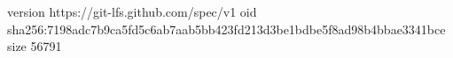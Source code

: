 version https://git-lfs.github.com/spec/v1
oid sha256:7198adc7b9ca5fd5c6ab7aab5bb423fd213d3be1bdbe5f8ad98b4bbae3341bce
size 56791
